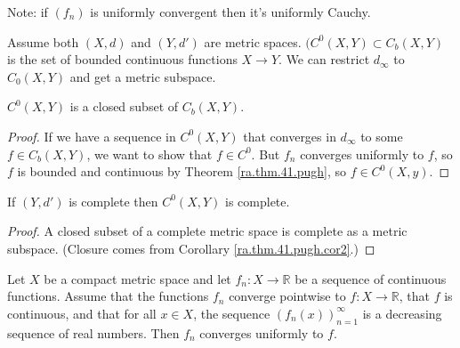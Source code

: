 Note: if \((f_n)\) is uniformly convergent then it's uniformly Cauchy.



\begin{definition}

Assume both \((X, d)\) and \((Y, d')\) are metric spaces. \((C^0(X,Y) \subset C_b(X,Y)\) is the set of bounded continuous functions \(X \to Y\). We can restrict \(d_\infty\) to \(C_0(X,Y)\) and get a metric subspace.

\end{definition}

\begin{corollary}\label{ra.thm.41.pugh.cor2}

\(C^0(X,Y)\) is a closed subset of \(C_b(X,Y)\).

\end{corollary}

\begin{proof}

If we have a sequence in \(C^0(X,Y)\) that converges in \(d_\infty\) to some \(f \in C_b(X,Y)\), we want to show that \(f \in C^0\). But \(f_n\) converges uniformly to \(f\), so \(f\) is bounded and continuous by Theorem \ref{ra.thm.41.pugh}, so \(f \in C^0(X, y)\). 


\end{proof}

\begin{corollary}\label{ra.thm.complete.c0}

If \((Y, d')\) is complete then \(C^0(X,Y)\) is complete. 

\end{corollary}

\begin{proof}

A closed subset of a complete metric space is complete as a metric subspace. (Closure comes from Corollary \ref{ra.thm.41.pugh.cor2}.)

\end{proof}

\begin{theorem}\label{ra.dini.thm}
Let $X$ be a compact metric space and let $f_n: X \to \mathbb{R}$ be a sequence of continuous functions. Assume that the functions $f_n$ converge pointwise to $f: X \to \mathbb{R}$, that $f$ is continuous, and that for all $x \in X$, the sequence $(f_n(x))_{n=1}^{\infty}$ is a decreasing sequence of real numbers. Then $f_n$ converges uniformly to $f$.
\end{theorem}

